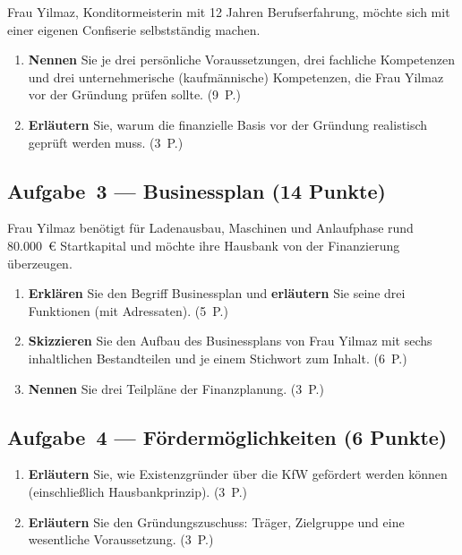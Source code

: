 \documentclass[11pt, a4paper]{article}
\begin{document}
Frau Yilmaz, Konditormeisterin mit 12 Jahren Berufserfahrung, möchte sich mit einer
eigenen Confiserie selbstständig machen.

\begin{enumerate}[label=(\alph*)]
  \item \textbf{Nennen} Sie je drei persönliche Voraussetzungen, drei fachliche
    Kompetenzen und drei unternehmerische (kaufmännische) Kompetenzen, die Frau Yilmaz
    vor der Gründung prüfen sollte. \hfill (9~P.)
  \item \textbf{Erläutern} Sie, warum die finanzielle Basis vor der Gründung realistisch
    geprüft werden muss. \hfill (3~P.)
\end{enumerate}

\subsection*{Aufgabe~3 --- Businessplan (14 Punkte)}

Frau Yilmaz benötigt für Ladenausbau, Maschinen und Anlaufphase rund 80.000~€
Startkapital und möchte ihre Hausbank von der Finanzierung überzeugen.

\begin{enumerate}[label=(\alph*)]
  \item \textbf{Erklären} Sie den Begriff Businessplan und \textbf{erläutern} Sie seine
    drei Funktionen (mit Adressaten). \hfill (5~P.)
  \item \textbf{Skizzieren} Sie den Aufbau des Businessplans von Frau Yilmaz mit sechs
    inhaltlichen Bestandteilen und je einem Stichwort zum Inhalt. \hfill (6~P.)
  \item \textbf{Nennen} Sie drei Teilpläne der Finanzplanung. \hfill (3~P.)
\end{enumerate}

\subsection*{Aufgabe~4 --- Fördermöglichkeiten (6 Punkte)}

\begin{enumerate}[label=(\alph*)]
  \item \textbf{Erläutern} Sie, wie Existenzgründer über die KfW gefördert werden können
    (einschließlich Hausbankprinzip). \hfill (3~P.)
  \item \textbf{Erläutern} Sie den Gründungszuschuss: Träger, Zielgruppe und eine
    wesentliche Voraussetzung. \hfill (3~P.)
\end{enumerate}
\end{document}
